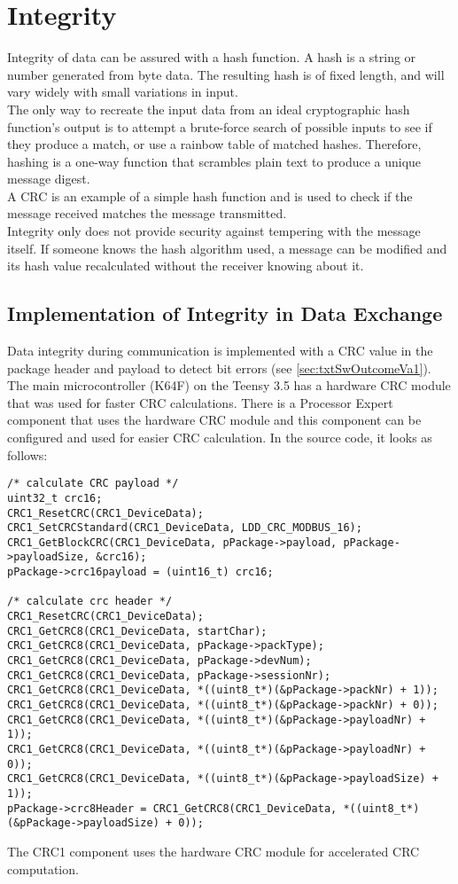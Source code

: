 \section{Integrity}
Integrity of data can be assured with a hash function. A hash is a string or number generated from byte data. The resulting hash is of fixed length, and will vary widely with small variations in input.\\
The only way to recreate the input data from an ideal cryptographic hash function's output is to attempt a brute-force search of possible inputs to see if they produce a match, or use a rainbow table of matched hashes. Therefore, hashing is a one-way function that scrambles plain text to produce a unique message digest.\\
A CRC is an example of a simple hash function and is used to check if the message received matches the message transmitted.\\
Integrity only does not provide security against tempering with the message itself. If someone knows the hash algorithm used, a message can be modified and its hash value recalculated without the receiver knowing about it.
%
\subsection{Implementation of Integrity in Data Exchange}
Data integrity during communication is implemented with a CRC value in the package header and payload to detect bit errors (see \autoref{sec:txtSwOutcomeVa1}). The main microcontroller (K64F) on the Teensy 3.5 has a hardware CRC module that was used for faster CRC calculations. There is a Processor Expert component that uses the hardware CRC module and this component can be configured and used for easier CRC calculation. In the source code, it looks as follows:
\begin{lstlisting}
/* calculate CRC payload */
uint32_t crc16;
CRC1_ResetCRC(CRC1_DeviceData);
CRC1_SetCRCStandard(CRC1_DeviceData, LDD_CRC_MODBUS_16);
CRC1_GetBlockCRC(CRC1_DeviceData, pPackage->payload, pPackage->payloadSize, &crc16);
pPackage->crc16payload = (uint16_t) crc16;

/* calculate crc header */
CRC1_ResetCRC(CRC1_DeviceData);
CRC1_GetCRC8(CRC1_DeviceData, startChar);
CRC1_GetCRC8(CRC1_DeviceData, pPackage->packType);
CRC1_GetCRC8(CRC1_DeviceData, pPackage->devNum);
CRC1_GetCRC8(CRC1_DeviceData, pPackage->sessionNr);
CRC1_GetCRC8(CRC1_DeviceData, *((uint8_t*)(&pPackage->packNr) + 1));
CRC1_GetCRC8(CRC1_DeviceData, *((uint8_t*)(&pPackage->packNr) + 0));
CRC1_GetCRC8(CRC1_DeviceData, *((uint8_t*)(&pPackage->payloadNr) + 1));
CRC1_GetCRC8(CRC1_DeviceData, *((uint8_t*)(&pPackage->payloadNr) + 0));
CRC1_GetCRC8(CRC1_DeviceData, *((uint8_t*)(&pPackage->payloadSize) + 1));
pPackage->crc8Header = CRC1_GetCRC8(CRC1_DeviceData, *((uint8_t*)(&pPackage->payloadSize) + 0));
\end{lstlisting}
The CRC1 component uses the hardware CRC module for accelerated CRC computation.
%
